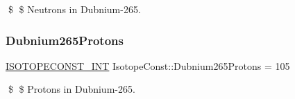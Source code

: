 \$ \$ Neutrons in Dubnium-\/265. \mbox{\label{group___isotope_const-_dubnium-_db265_gadf40bb6e0a9795f0509262274b545f7d}} 
\subsubsection{\texorpdfstring{Dubnium265\+Protons}{Dubnium265Protons}}
{\footnotesize\ttfamily \mbox{\hyperlink{group___isotope_const-_macros_ga5f18360b3e99483a35c32d789e62621c}{I\+S\+O\+T\+O\+P\+E\+C\+O\+N\+S\+T\+\_\+\+I\+NT}} Isotope\+Const\+::\+Dubnium265\+Protons = 105}

\$ \$ Protons in Dubnium-\/265. 